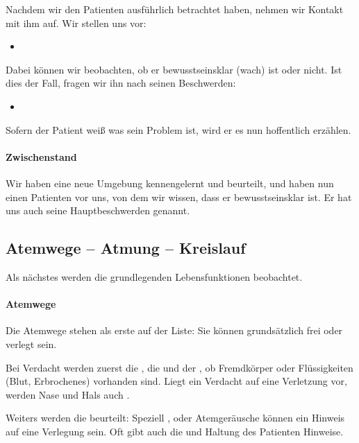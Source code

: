 Nachdem wir den Patienten ausführlich betrachtet haben,
nehmen wir Kontakt mit ihm auf. Wir stellen uns vor:

\begin{itemize}
  \item {}
\end{itemize}

Dabei können wir beobachten, ob er bewusstseinsklar (wach)
ist oder nicht. Ist dies der Fall, fragen wir ihn nach
seinen Beschwerden:

\begin{itemize}
  \item {}
\end{itemize}

Sofern der Patient weiß was sein Problem ist, wird er es nun
hoffentlich erzählen. 

\paragraph{Zwischenstand}

Wir haben eine neue Umgebung kennengelernt und beurteilt,
und haben nun einen Patienten vor uns, von dem wir
wissen, dass er bewusstseinsklar ist. Er hat uns auch seine Hauptbeschwerden genannt.

\subsection{Atemwege -- Atmung -- Kreislauf}

Als nächstes werden die grundlegenden Lebensfunktionen
beobachtet. 

\paragraph{Atemwege} 
Die Atemwege stehen als erste auf der
Liste: Sie können grundsätzlich frei oder verlegt sein. 


Bei Verdacht werden zuerst die , die  und der
 , ob Fremdkörper oder Flüssigkeiten (Blut,
Erbrochenes) vorhanden sind.
Liegt ein Verdacht auf eine
Verletzung vor, werden Nase und Hals auch .

Weiters werden die  beurteilt: 
Speziell ,  oder 
Atemgeräusche können ein Hinweis auf eine Verlegung sein.
Oft gibt auch die  und Haltung des Patienten
Hinweise. 

